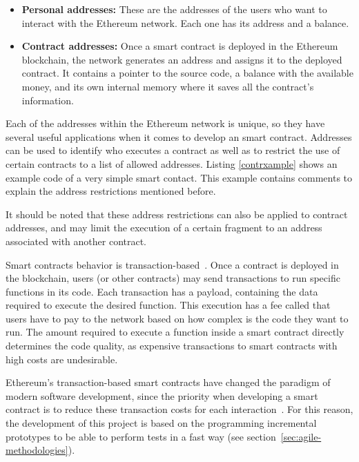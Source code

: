 \begin{itemize}

\item \textbf{Personal addresses:} These are the addresses of the users who want
  to interact with the Ethereum network. Each one has its address and a balance.
  
\item \textbf{Contract addresses:} Once a smart contract is deployed in the
  Ethereum blockchain, the network generates an address and assigns it to the
  deployed contract. It contains a pointer to the source code, a balance with
  the available money, and its own internal memory where it saves all the
  contract's information.

\end{itemize}

Each of the addresses within the Ethereum network is unique, so they have
several useful applications when it comes to develop an smart contract.
Addresses can be used to identify who executes a contract as well as to restrict
the use of certain contracts to a list of allowed addresses. Listing
\ref{contrxample} shows an example code of a very simple smart contact. This
example contains comments to explain the address restrictions mentioned before.

It should be noted that these address restrictions can also be applied to
contract addresses, and may limit the execution of a certain fragment to an
address associated with another contract.



Smart contracts behavior is transaction-based~\cite{wood2014ethereum}. Once a
contract is deployed in the blockchain, users (or other contracts) may send
transactions to run specific functions in its code. Each transaction has a
payload, containing the data required to execute the desired function. This
execution has a fee called  that users have to pay to the network based
on how complex is the code they want to run. The  amount required to
execute a function inside a smart contract directly determines the code quality,
as expensive transactions to smart contracts with high  costs are
undesirable.

Ethereum's transaction-based smart contracts have changed the paradigm of modern
software development, since the priority when developing a smart contract is to
reduce these transaction costs for each interaction~\cite{delmolino2016step}.
For this reason, the development of this project is based on the programming
incremental prototypes to be able to perform tests in a fast way (see
section~\ref{sec:agile-methodologies}).


